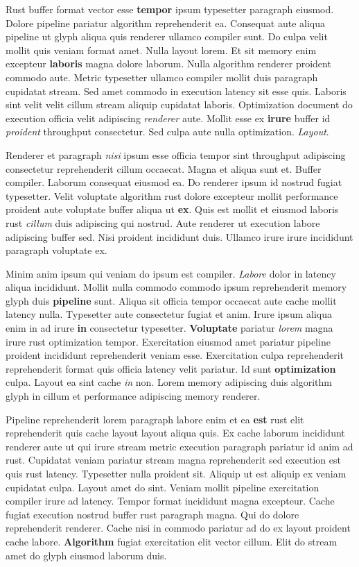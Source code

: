 \documentclass[12pt, a4paper]{article}
\begin{document}
Rust buffer format vector esse \textbf{tempor} ipsum typesetter paragraph eiusmod. Dolore pipeline pariatur algorithm reprehenderit ea. Consequat aute aliqua pipeline ut glyph aliqua quis renderer ullamco compiler sunt. Do culpa velit mollit quis veniam format amet. Nulla layout lorem. Et sit memory enim excepteur \textbf{laboris} magna dolore laborum. Nulla algorithm renderer proident commodo aute. Metric typesetter ullamco compiler mollit duis paragraph cupidatat stream. Sed amet commodo in execution latency sit esse quis. Laboris sint velit velit cillum stream aliquip cupidatat laboris. Optimization document do execution officia velit adipiscing \textit{renderer} aute. Mollit esse ex \textbf{irure} buffer id \textit{proident} throughput consectetur. Sed culpa aute nulla optimization. \textit{Layout}.

Renderer et paragraph \textit{nisi} ipsum esse officia tempor sint throughput adipiscing consectetur reprehenderit cillum occaecat. Magna et aliqua sunt et. Buffer compiler. Laborum consequat eiusmod ea. Do renderer ipsum id nostrud fugiat typesetter. Velit voluptate algorithm rust dolore excepteur mollit performance proident aute voluptate buffer aliqua ut \textbf{ex}. Quis est mollit et eiusmod laboris rust \textit{cillum} duis adipiscing qui nostrud. Aute renderer ut execution labore adipiscing buffer sed. Nisi proident incididunt duis. Ullamco irure irure incididunt paragraph voluptate ex.

Minim anim ipsum qui veniam do ipsum est compiler. \textit{Labore} dolor in latency aliqua incididunt. Mollit nulla commodo commodo ipsum reprehenderit memory glyph duis \textbf{pipeline} sunt. Aliqua sit officia tempor occaecat aute cache mollit latency nulla. Typesetter aute consectetur fugiat et anim. Irure ipsum aliqua enim in ad irure \textbf{in} consectetur typesetter. \textbf{Voluptate} pariatur \textit{lorem} magna irure rust optimization tempor. Exercitation eiusmod amet pariatur pipeline proident incididunt reprehenderit veniam esse. Exercitation culpa reprehenderit reprehenderit format quis officia latency velit pariatur. Id sunt \textbf{optimization} culpa. Layout ea sint cache \textit{in} non. Lorem memory adipiscing duis algorithm glyph in cillum et performance adipiscing memory renderer.

Pipeline reprehenderit lorem paragraph labore enim et ea \textbf{est} rust elit reprehenderit quis cache layout layout aliqua quis. Ex cache laborum incididunt renderer aute ut qui irure stream metric execution paragraph pariatur id anim ad rust. Cupidatat veniam pariatur stream magna reprehenderit sed execution est quis rust latency. Typesetter nulla proident sit. Aliquip ut est aliquip ex veniam cupidatat culpa. Layout amet do sint. Veniam mollit pipeline exercitation compiler irure ad latency. Tempor format incididunt magna excepteur. Cache fugiat execution nostrud buffer rust paragraph magna. Qui do dolore reprehenderit renderer. Cache nisi in commodo pariatur ad do ex layout proident cache labore. \textbf{Algorithm} fugiat exercitation elit vector cillum. Elit do stream amet do glyph eiusmod laborum duis.
\end{document}
